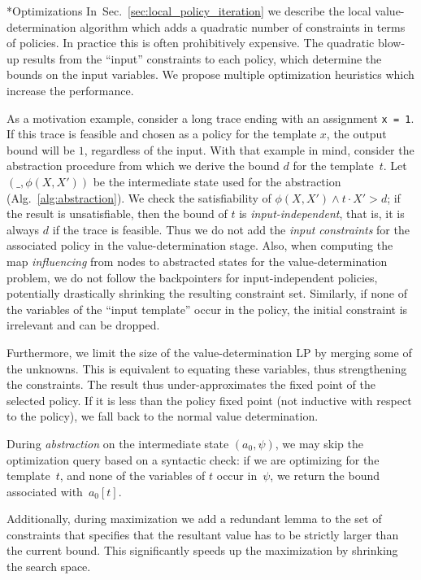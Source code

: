 \documentclass{llncs}
\makeatletter
\newcommand{\tuple}[1]{\ensuremath{\left( #1 \right) }}
\renewcommand{\paragraph}{\@startsection{paragraph}{4}{\z@}{0.8ex \@plus 0ex \@minus 1ex}{-1em}{\normalfont\normalsize\bfseries}}
\makeatother
\begin{document}
\paragraph*{Optimizations}
In~Sec.~\ref{sec:local_policy_iteration} we describe the local value-determination
algorithm which adds a quadratic number of constraints in terms of policies.
In practice this is often prohibitively expensive.
The quadratic blow-up results from the ``input'' constraints to each policy,
which determine the bounds on the input variables.
We propose multiple optimization heuristics which increase the performance.

As a motivation example, consider a long trace ending with an
assignment \texttt{x = 1}.
If this trace is feasible and chosen as a policy for the template $x$, the
output bound will be $1$, regardless of the input.
With that example in mind, consider the abstraction procedure from which we
derive the bound $d$ for the template~$t$.
Let $\tuple{\_, \phi(X,X')}$ be the intermediate state used for the abstraction
(Alg.~\ref{alg:abstraction}).
We check the satisfiability of $\phi(X,X') \land t \cdot X' > d$;
if the result is unsatisfiable, then the bound of $t$ is
\emph{input-independent}, that is, it is always $d$ if the
trace is feasible.
Thus we do not add the \emph{input constraints} for
the associated policy in the value-determination stage.
Also, when computing the map \emph{influencing} from nodes to abstracted states for the
value-determination problem, we do not follow the backpointers for
input-independent policies, potentially drastically shrinking
the resulting constraint set.
Similarly, if none of the variables of the ``input template'' occur in the
policy, the initial constraint is irrelevant and can be dropped.

Furthermore,
we limit the size of the value-determination LP by merging some of the unknowns.
This is equivalent to equating these variables, thus strengthening the constraints.
The result thus under-approximates the fixed point of the selected policy.
If it is less than the policy fixed point (not inductive with respect to the policy),
we fall back to the normal value determination.

During \emph{abstraction} on the intermediate state $\tuple{a_0, \psi}$,
we may skip the optimization query based on a syntactic check:
if we are optimizing for the template~$t$, and
none of the variables of $t$ occur in~$\psi$, we return the bound
associated with~$a_0[t]$.

Additionally, during maximization we add a redundant lemma to the set of constraints that
specifies that the resultant value has to be strictly larger than the current
bound.
This significantly speeds up the maximization by shrinking the search space.
\end{document}
